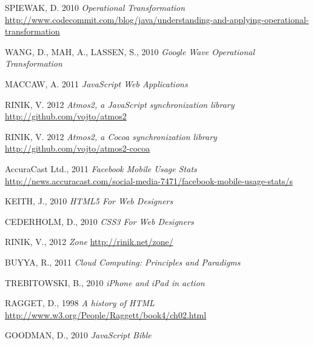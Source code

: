 \begin{thebibliography}{999}
SPIEWAK, D. 2010 \emph{Operational Transformation}
\url{http://www.codecommit.com/blog/java/understanding-and-applying-operational-transformation}

WANG, D., MAH, A., LASSEN, S., 2010 \emph{Google Wave Operational Transformation}

MACCAW, A. 2011 \emph{JavaScript Web Applications}

RINIK, V. 2012 \emph{Atmos2, a JavaScript synchronization library}
\url{http://github.com/vojto/atmos2}

RINIK, V. 2012 \emph{Atmos2, a Cocoa synchronization library}
\url{http://github.com/vojto/atmos2-cocoa}

AccuraCast Ltd., 2011 \emph{Facebook Mobile Usage Stats}
\url{http://news.accuracast.com/social-media-7471/facebook-mobile-usage-stats/s}

KEITH, J., 2010 \emph{HTML5 For Web Designers}

CEDERHOLM, D., 2010 \emph{CSS3 For Web Designers}

RINIK, V., 2012 \emph{Zone}
\url{http://rinik.net/zone/}

BUYYA, R., 2011 \emph{Cloud Computing: Principles and Paradigms}

TREBITOWSKI, B., 2010 \emph{iPhone and iPad in action}

RAGGET, D., 1998 \emph{A history of HTML}
\url{http://www.w3.org/People/Raggett/book4/ch02.html}

GOODMAN, D., 2010 \emph{JavaScript Bible}


\end{thebibliography}
